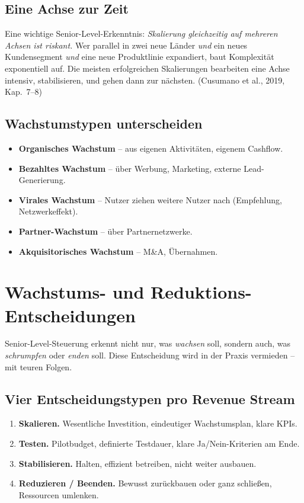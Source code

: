 \documentclass[11pt,a4paper,oneside]{article}
\newcommand{\quelle}[1]{{\footnotesize\color{lpGray}(#1)}}
\begin{document}
\subsection{Eine Achse zur Zeit}

Eine wichtige Senior-Level-Erkenntnis: \emph{Skalierung gleichzeitig auf mehreren Achsen ist riskant.} Wer parallel in zwei neue Länder \emph{und} ein neues Kundensegment \emph{und} eine neue Produktlinie expandiert, baut Komplexität exponentiell auf. Die meisten erfolgreichen Skalierungen bearbeiten eine Achse intensiv, stabilisieren, und gehen dann zur nächsten. \quelle{Cusumano et al., 2019, Kap.~7--8}

\subsection{Wachstumstypen unterscheiden}

\begin{itemize}
  \item \textbf{Organisches Wachstum} -- aus eigenen Aktivitäten, eigenem Cashflow.
  \item \textbf{Bezahltes Wachstum} -- über Werbung, Marketing, externe Lead-Generierung.
  \item \textbf{Virales Wachstum} -- Nutzer ziehen weitere Nutzer nach (Empfehlung, Netzwerkeffekt).
  \item \textbf{Partner-Wachstum} -- über Partnernetzwerke.
  \item \textbf{Akquisitorisches Wachstum} -- M\&A, Übernahmen.
\end{itemize}

\section{Wachstums- und Reduktions-Entscheidungen}

Senior-Level-Steuerung erkennt nicht nur, was \emph{wachsen} soll, sondern auch, was \emph{schrumpfen} oder \emph{enden} soll. Diese Entscheidung wird in der Praxis vermieden -- mit teuren Folgen.

\subsection{Vier Entscheidungstypen pro Revenue Stream}

\begin{enumerate}
  \item \textbf{Skalieren.} Wesentliche Investition, eindeutiger Wachstumsplan, klare KPIs.
  \item \textbf{Testen.} Pilotbudget, definierte Testdauer, klare Ja/Nein-Kriterien am Ende.
  \item \textbf{Stabilisieren.} Halten, effizient betreiben, nicht weiter ausbauen.
  \item \textbf{Reduzieren / Beenden.} Bewusst zurückbauen oder ganz schließen, Ressourcen umlenken.
\end{enumerate}
\end{document}
